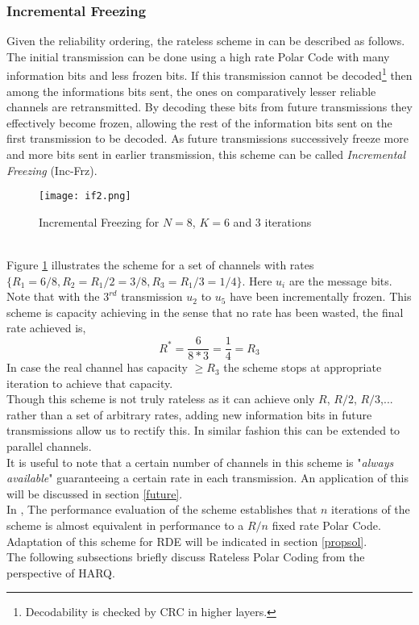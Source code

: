 \documentclass[
11pt, %
a4paper, %
oneside, %
headinclude,footinclude, %
BCOR5mm, %
]{scrartcl}
\begin{document}
\subsubsection{Incremental Freezing}\label{if}
Given the reliability ordering, the rateless scheme in \cite{chen} can be described as follows. The initial transmission can be done using a high rate Polar Code with many information bits and less frozen bits. If this transmission cannot be decoded\footnote{Decodability is checked by CRC in higher layers.} then among the informations bits sent, the ones on comparatively lesser reliable channels are retransmitted. By decoding these bits from future transmissions they effectively become frozen, allowing the rest of the information bits sent on the first transmission to be decoded.  As future transmissions successively freeze more and more bits sent in earlier transmission, this scheme can be called \emph{Incremental Freezing} (Inc-Frz).
\begin{figure}[h]
 \begin{center}
    \texttt{[image: if2.png]}
  \end{center}
  \caption{Incremental Freezing for $N=8$, $K=6$ and $3$ iterations}
  \label{fig:if}
\end{figure}  
\\Figure \ref{fig:if} illustrates the scheme for a set of channels with rates $\{ R_1=6/8, R_2= R_1/2=3/8,R_3= R_1/3=1/4\}$. Here $u_i$ are the message bits. Note that with the $3^{rd}$ transmission  $u_2$ to $u_{5}$ have been incrementally frozen. This scheme is capacity achieving in the sense that no rate has been wasted, the final rate achieved is, $$R^*= \frac{6}{8*3}=\frac{1}{4}=R_3 $$ In case the real channel has capacity $ \geq R_3$ the scheme stops at appropriate iteration to achieve that capacity.\\
Though this scheme is not truly rateless as it can achieve only $R$, $R/2$, $R/3$,... rather than a set of arbitrary rates, adding new information bits in future transmissions allow us to rectify this. In similar fashion this can be extended to parallel channels.\\
It is useful to note that a certain number of channels in this scheme is "\emph{always available}" guaranteeing a certain rate in each transmission. An application of this will be discussed in section \ref{future}.
\\In \cite{chen}, The performance evaluation of the scheme establishes that $n$ iterations of the scheme is almost equivalent in performance to a $R/n$ fixed rate Polar Code.
\\Adaptation of this scheme for RDE will be indicated in section \ref{propsol}.
\\The following subsections briefly discuss Rateless Polar Coding from the perspective of HARQ.
\end{document}
